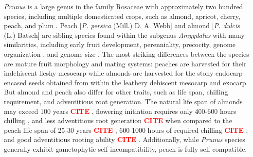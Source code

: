 \documentclass[12pt]{article}
\newcommand{\citex}{\textcolor{red}{\bf CITE }}
\begin{document}
\emph{Prunus} is a large genus in the family Rosaceae with approximately two hundred species, including multiple domesticated crops, such as almond, apricot, cherry, peach, and plum \citep{rehder1940manual}.
%
Peach [\emph{P. persica} (Mill.) D. A. Webb] and almond [\emph{P. dulcis} (L.) Batsch] are sibling species found within the subgenus \emph{Amygdalus} with many similarities, including early fruit development, perenniality, precocity, genome organization \citep{arus2012peach}, and genome size \citep{baird1994estimating}. 
%
The most striking differences between the species are mature fruit morphology and mating systems: peaches are harvested for their indehiscent fleshy mesocarp while almonds are harvested for the stony endocarp encased seeds obtained from within the leathery dehiscent mesocarp and exocarp. 
%
But almond and peach also differ for other traits, such as life span, chilling requirement, and adventitious root generation.
%
The natural life span of almonds may exceed 100 years \citex,
flowering initiation requires only 400-600 hours chilling \citep{alonso2005determination}, %
and less adventitious root generation \citex when compared to the peach life span of 25-30 years \citex, %
600-1000 hours of required chilling \citex, %
and good adventitious rooting ability \citex. 
%
Additionally, while \emph{Prunus} species generally exhibit gametophytic self-incompatibility, peach is fully self-compatible.
\end{document}
